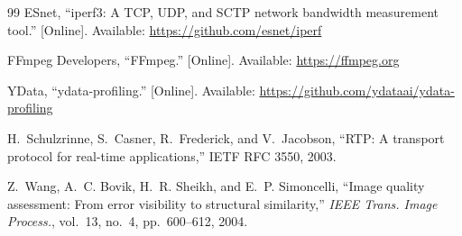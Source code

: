 \documentclass[conference,a4paper]{IEEEtran}
\begin{document}
\begin{thebibliography}{99}
 ESnet, ``iperf3: A TCP, UDP, and SCTP network bandwidth measurement tool.'' [Online]. Available:
\url{https://github.com/esnet/iperf}

 FFmpeg Developers, ``FFmpeg.'' [Online]. Available: \url{https://ffmpeg.org}

 YData, ``ydata-profiling.'' [Online]. Available:
\url{https://github.com/ydataai/ydata-profiling}

 H.~Schulzrinne, S.~Casner, R.~Frederick, and V.~Jacobson, ``RTP: A transport protocol for
real-time applications,'' IETF RFC 3550, 2003.

 Z.~Wang, A.~C. Bovik, H.~R. Sheikh, and E.~P. Simoncelli, ``Image quality assessment: From
error visibility to structural similarity,'' \textit{IEEE Trans. Image Process.}, vol.~13, no.~4, pp.~600--612,
2004.
\end{thebibliography}
\end{document}
